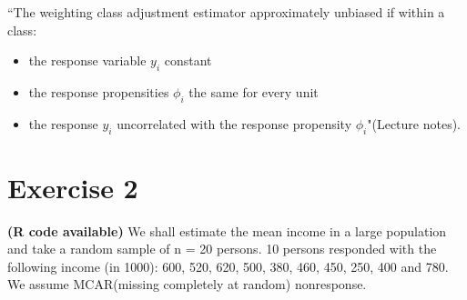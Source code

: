 \documentclass[12pt]{article}
\begin{document}
\begin{enumerate}
{\begin{minipage}[t]{0.97\linewidth}
``The weighting class adjustment estimator approximately unbiased if within a class:
\begin{itemize}
\item the response variable $y_i$ constant
\item the response propensities $\phi_i$ the same for every unit
\item the response $y_i$ uncorrelated with the response propensity $\phi_i$"(Lecture notes).
\end{itemize}
\end{minipage}}
\end{enumerate}

\section*{Exercise 2}
\textbf{\color{ForestGreen}(R code available)} We shall estimate the mean income in a large population and take a random sample of n = 20 persons. 10 persons responded with the following income (in 1000): 600, 520, 620, 500, 380, 460, 450, 250, 400 and 780. We assume MCAR(missing completely at random) nonresponse. 
\end{document}
